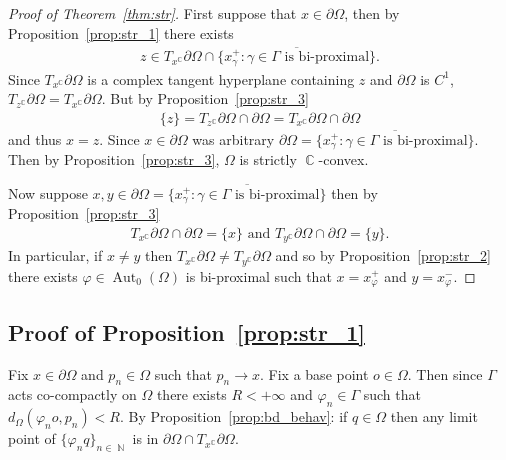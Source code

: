 \documentclass[12pt]{amsart}
\theoremstyle{plain}
\theoremstyle{definition}
\theoremstyle{remark}
\begin{document}
\begin{proof}[Proof of Theorem~\ref{thm:str}]
First suppose that $x \in \partial \Omega$, then by Proposition~\ref{prop:str_1} there exists
\begin{align*}
z \in T_x^\operatorname{\mathbb{C}} \partial \Omega \cap \overline{\{ x^+_{\gamma} : \gamma \in \Gamma \text{ is bi-proximal} \}}.
\end{align*}
Since $T_x^\operatorname{\mathbb{C}} \partial \Omega$ is a complex tangent hyperplane containing $z$ and $\partial \Omega$ is $C^1$, $T_z^\operatorname{\mathbb{C}} \partial \Omega = T_x^\operatorname{\mathbb{C}} \partial \Omega$. But by Proposition~\ref{prop:str_3} 
\begin{align*}
 \{z\} = T_z^\operatorname{\mathbb{C}} \partial \Omega \cap \partial \Omega = T_x^\operatorname{\mathbb{C}} \partial \Omega \cap \partial \Omega
\end{align*}
and thus $x=z$. Since $x \in \partial \Omega$ was arbitrary $\partial \Omega =   \overline{\{ x^+_{\gamma} : \gamma \in \Gamma \text{ is bi-proximal} \}}$. Then by Proposition~\ref{prop:str_3}, $\Omega$ is strictly $\operatorname{\mathbb{C}}$-convex. 

Now suppose $x,y  \in \partial \Omega= \overline{\{ x^+_{\gamma} : \gamma \in \Gamma \text{ is bi-proximal} \}}$ then by Proposition~\ref{prop:str_3} 
\begin{align*}
T_x^\operatorname{\mathbb{C}} \partial \Omega \cap \partial \Omega = \{x\} \text{ and } T_y^\operatorname{\mathbb{C}} \partial \Omega \cap \partial \Omega = \{y\}.
\end{align*}
In particular, if $x \neq y$ then $T_x^\operatorname{\mathbb{C}} \partial \Omega \neq T_y^\operatorname{\mathbb{C}} \partial \Omega$ and so by Proposition~\ref{prop:str_2} there exists $\varphi \in \operatorname{Aut}_0(\Omega)$ is bi-proximal such that $x=x^+_{\varphi}$ and $y=x^-_{\varphi}$. 
\end{proof}

\subsection{Proof of Proposition~\ref{prop:str_1}}

Fix $x \in \partial \Omega$ and $p_n \in \Omega$ such that $p_n \rightarrow x$. Fix a base point $o \in \Omega$. Then since $\Gamma$ acts co-compactly on $\Omega$ there exists $R<+\infty$ and $\varphi_n \in \Gamma$ such that $d_{\Omega}(\varphi_n o, p_n) < R$. By Proposition~\ref{prop:bd_behav}: if $q \in \Omega$ then any limit point of $\{ \varphi_n q\}_{n \in \operatorname{\mathbb{N}}}$ is in $\partial \Omega \cap T_x^\operatorname{\mathbb{C}} \partial \Omega$. 
\end{document}
